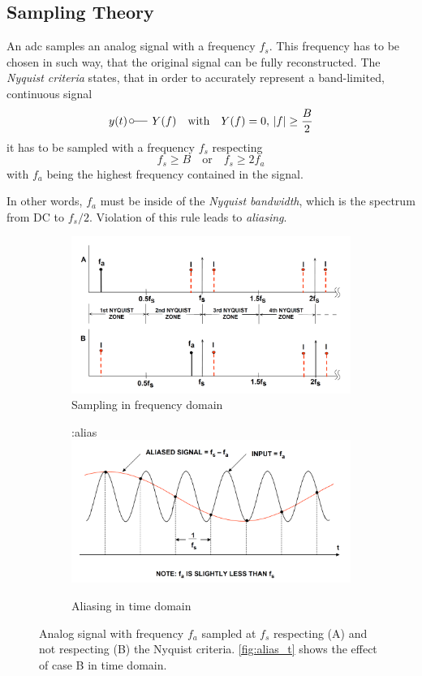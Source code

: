 \subsection{Sampling Theory}
An \gls{adc} samples an analog signal with a frequency $f_s$. This frequency has to be chosen in such way, that the original signal can be fully reconstructed. The \textit{Nyquist criteria} states, that in order to accurately represent a band-limited, continuous signal
\begin{equation}
	y (t) \, \fourier  Y(f) \quad \text{with} \quad Y(f) = 0, \, |f| \geq \frac{B}{2}
\end{equation}
it has to be sampled with a frequency $f_s$ respecting
\begin{equation}
	f_s \geq B \quad \text{or} \quad f_s \geq 2 f_a
\end{equation}
with $f_a$ being the highest frequency contained in the signal. \cite{walt,puente2015}

In other words, $f_a$ must be inside of the \textit{Nyquist bandwidth}, which is the spectrum from DC to $f_s/2$. Violation of this rule leads to \textit{aliasing}.

\begin{figure}[H]
	\centering
	\begin{subfigure}{\textwidth}
	\centering
	\includegraphics[width=.6\linewidth]{chap/02-theory/img/alias_f}  
	\caption{Sampling in frequency domain}
	\label{fig:alias_f}
	\end{subfigure}
	\begin{subfigure}{\textwidth}
	\centering
:alias	\includegraphics[width=.6\linewidth]{chap/02-theory/img/alias_t}  
	\caption{Aliasing in time domain}
	\label{fig:alias_t}
	\end{subfigure}
	\caption{Analog signal with frequency $f_a$ sampled at $f_s$ respecting (A) and not respecting (B) the Nyquist criteria. \autoref{fig:alias_t} shows the effect of case B in time domain. \cite{walt}}
\end{figure}


